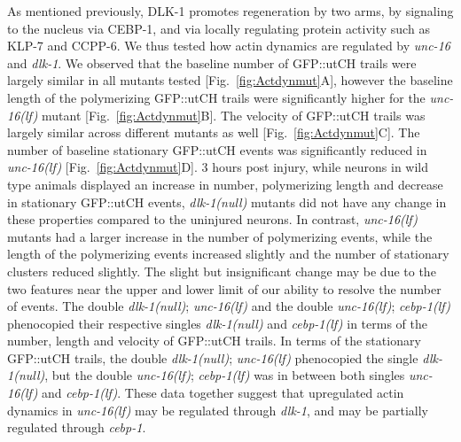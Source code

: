 \begin{appendices}
	As mentioned previously, DLK-1 promotes regeneration by two arms, by signaling to the nucleus via CEBP-1, and via locally regulating protein activity such as KLP-7 and CCPP-6. We thus tested how actin dynamics are regulated by \textit{unc-16} and \textit{dlk-1}. We observed that the baseline number of GFP::utCH trails were largely similar in all mutants tested [Fig.~\ref{fig:Actdynmut}A], however the baseline length of the polymerizing GFP::utCH trails were significantly higher for the \textit{unc-16(lf)} mutant [Fig.~\ref{fig:Actdynmut}B]. The velocity of GFP::utCH trails was largely similar across different mutants as well [Fig.~\ref{fig:Actdynmut}C]. The number of baseline stationary GFP::utCH events was significantly reduced in \textit{unc-16(lf)} [Fig.~\ref{fig:Actdynmut}D]. 3 hours post injury, while neurons in wild type animals displayed an increase in number, polymerizing length and decrease in stationary GFP::utCH events, \textit{dlk-1(null)} mutants did not have any change in these properties compared to the uninjured neurons. In contrast, \textit{unc-16(lf)} mutants had a larger increase in the number of polymerizing events, while the length of the polymerizing events increased slightly and the number of stationary clusters reduced slightly. The slight but insignificant change may be due to the two features near the upper and lower limit of our ability to resolve the number of events. The double \textit{dlk-1(null)}; \textit{unc-16(lf)} and the double \textit{unc-16(lf)}; \textit{cebp-1(lf)} phenocopied their respective singles \textit{dlk-1(null)} and \textit{cebp-1(lf)} in terms of the number, length and velocity of GFP::utCH trails. In terms of the stationary GFP::utCH trails, the double \textit{dlk-1(null)}; \textit{unc-16(lf)} phenocopied the single \textit{dlk-1(null)}, but the double \textit{unc-16(lf)}; \textit{cebp-1(lf)} was in between both singles \textit{unc-16(lf)} and \textit{cebp-1(lf)}. These data  together suggest that upregulated actin dynamics in \textit{unc-16(lf)} may be regulated through \textit{dlk-1}, and may be partially regulated through \textit{cebp-1}.
	
	
	

\end{appendices}
